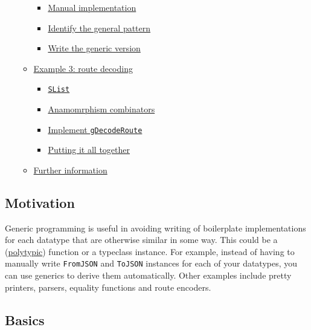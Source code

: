 \begin{itemize}
\begin{itemize}
    \begin{itemize}
    \tightlist
    \item
      \protect\hyperlink{manual-implementation}{Manual implementation}
    \item
      \protect\hyperlink{identify-the-general-pattern}{Identify the
      general pattern}
    \item
      \protect\hyperlink{write-the-generic-version}{Write the generic
      version}
    \end{itemize}
  \item
    \protect\hyperlink{example-3-route-decoding}{Example 3: route
    decoding}

    \begin{itemize}
    \tightlist
    \item
      \protect\hyperlink{slist}{\texttt{SList}}
    \item
      \protect\hyperlink{anamomrphism-combinators}{Anamomrphism
      combinators}
    \item
      \protect\hyperlink{implement-gdecoderoute}{Implement
      \texttt{gDecodeRoute}}
    \item
      \protect\hyperlink{putting-it-all-together}{Putting it all
      together}
    \end{itemize}
  \item
    \protect\hyperlink{further-information}{Further information}
  \end{itemize}
\end{itemize}

\hypertarget{motivation}{%
\subsection{Motivation}\label{motivation}}

Generic programming is useful in avoiding writing of boilerplate
implementations for each datatype that are otherwise similar in some
way. This could be a
(\href{https://www.sciencedirect.com/science/article/pii/S0167642304000152}{polytypic})
function or a typeclass instance. For example, instead of having to
manually write \texttt{FromJSON} and \texttt{ToJSON} instances for each
of your datatypes, you can use generics to derive them automatically.
Other examples include pretty printers, parsers, equality functions and
route encoders.

\hypertarget{basics}{%
\subsection{Basics}\label{basics}}

